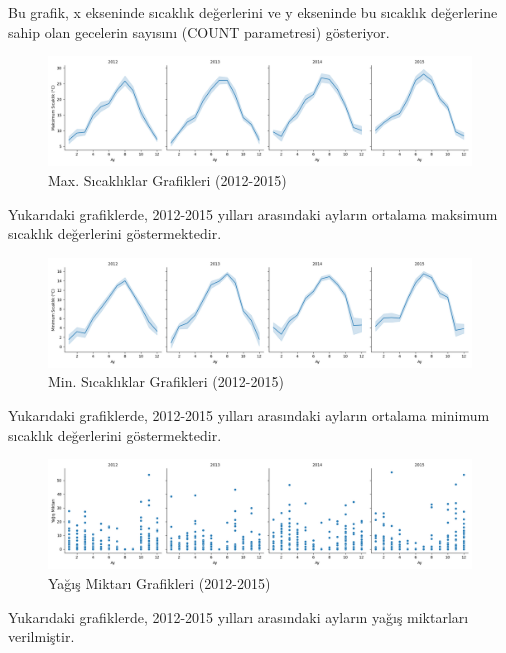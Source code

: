 \documentclass[twocolumn]{article}
\begin{document}
	Bu grafik, x ekseninde sıcaklık değerlerini ve y ekseninde bu sıcaklık değerlerine sahip olan gecelerin sayısını (COUNT parametresi) gösteriyor.
	
	\begin{figure}[h]
		\centering
		\includegraphics[width=\linewidth]{"Figures/Figure3.png"}
		\caption{Max. Sıcaklıklar Grafikleri (2012-2015)}
		\label{fig:ornek}
	\end{figure}
	
	Yukarıdaki grafiklerde, 2012-2015 yılları arasındaki ayların ortalama maksimum sıcaklık değerlerini göstermektedir. 
	
	\begin{figure}[H]
		\centering
		\includegraphics[width=\linewidth]{"Figures/Figure4.png"}
		\caption{Min. Sıcaklıklar Grafikleri (2012-2015)}
		\label{fig:ornek}
		
	\end{figure}
	Yukarıdaki grafiklerde, 2012-2015 yılları arasındaki ayların ortalama minimum sıcaklık değerlerini göstermektedir. 
	
	\begin{figure}[H]
		\centering
		\includegraphics[width=\linewidth]{"Figures/Figure5.png"}
		\caption{Yağış Miktarı Grafikleri (2012-2015)}
		\label{fig:ornek}
	\end{figure}
	
	Yukarıdaki grafiklerde, 2012-2015 yılları arasındaki ayların yağış miktarları verilmiştir.
	
\end{document}
